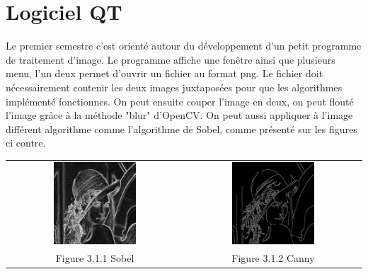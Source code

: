 \documentclass[12pt,a4paper]{report}
\begin{document}
\section{Logiciel QT}
Le premier semestre c'est orienté autour du développement d'un petit programme de traitement d'image. Le programme affiche une fenêtre ainsi que plusieurs menu, l'un deux permet d'ouvrir un fichier au format png.
Le fichier doit nécessairement contenir les deux images juxtaposées pour que les algorithmes implémenté fonctionnes. On peut ensuite couper l'image en deux, on peut flouté l'image grâce à la méthode "blur" d'OpenCV. On peut aussi appliquer à l'image différent algorithme comme l'algorithme de Sobel, comme présenté sur les figures ci contre.
\begin{center}
\begin{tabular}{cc}
  \vspace{0pt} \includegraphics[width=0.49\textwidth]{sobel.jpg} &
  \vspace{0pt} \includegraphics[width=0.49\textwidth]{canny.jpg} \\
    
  Figure 3.1.1 Sobel & Figure 3.1.2 Canny
\end{tabular}
\end{center}
\end{document}
